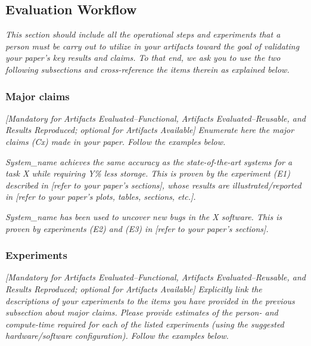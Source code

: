 \documentclass[nonacm,sigconf]{acmart}
\begin{document}
\subsection{Evaluation Workflow}

\emph{This section should include all the operational steps and
experiments that a person must be carry out to utilize in your
artifacts toward the goal of validating your paper's key results and
claims.  To that end, we ask you to use the two following subsections
and cross-reference the items therein as explained below.}


\subsubsection{Major claims}

\emph{[Mandatory for \emph{Artifacts Evaluated--Functional},
  \emph{Artifacts Evaluated--Reusable}, and \emph{Results Reproduced};
  optional for \emph{Artifacts Available}]}
%
\emph{Enumerate here the major claims (Cx) made in your paper.  Follow
the examples below.}
\bigskip

\begin{compactitem}
\item[(C1):]
  \emph{System\_name achieves the same accuracy as the
  state-of-the-art systems for a task X while requiring Y\% less
  storage.  This is proven by the experiment (E1) described in [refer
    to your paper's sections], whose results are illustrated/reported
  in [refer to your paper's plots, tables, sections, etc.].}

\item[(C2):]
  \emph{System\_name has been used to uncover new bugs in the X
  software.  This is proven by experiments (E2) and (E3) in [refer to
    your paper's sections].}
\end{compactitem}


\subsubsection{Experiments}

\emph{[Mandatory for \emph{Artifacts Evaluated--Functional},
  \emph{Artifacts Evaluated--Reusable}, and \emph{Results Reproduced};
  optional for \emph{Artifacts Available}]}
%
\emph{Explicitly link the descriptions of your experiments to the
items you have provided in the previous subsection about major claims.
Please provide estimates of the person- and compute-time required for
each of the listed experiments (using the suggested hardware/software
configuration).  Follow the examples below.}
\end{document}
